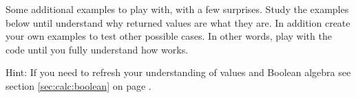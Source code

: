 \documentclass[krantz2]{krantz}\usepackage{knitr}%
\begin{document}
\begin{playground}
Some additional examples to play with, with a few surprises. Study the examples below until understand why returned values are what they are. In addition create your own examples to test other possible cases. In other words, play with the code until you fully understand how  works.

\begin{knitrout}\footnotesize
{}\color{fgcolor}\begin{kframe}
\begin{alltt}
 \hlkwb{<-} \hlopt{:}
 \hlopt{>} \hlstd{,} \hlstd{,} \hlopt{-}\hlstd{)}
 \hlopt{>}  \hlopt{+}  \hlopt{-} \hlstd{)}
\hlstd{(} \hlopt{>}  \hlopt{+}  \hlopt{-} \hlstd{)} 
\hlstd{(}\hlstd{(} \hlopt{+}  \hlopt{-} \hlstd{)} 
\hlstd{(} \hlopt{+}  \hlopt{-} \hlstd{)} 
\end{alltt}
\end{kframe}
\end{knitrout}
Hint: If you need to refresh your understanding of  values and Boolean algebra see section \ref{sec:calc:boolean} on page \pageref{sec:calc:boolean}.
\end{playground}
\end{document}
